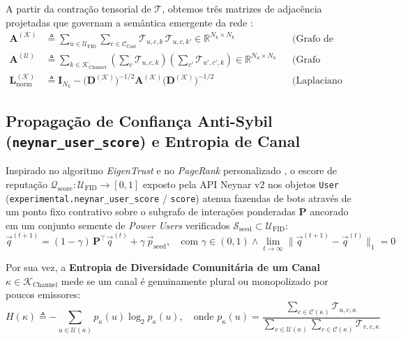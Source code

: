 \documentclass[11pt,a4paper]{article}
\begin{document}
A partir da contração tensorial de $\boldsymbol{\mathcal{T}}$, obtemos três matrizes de adjacência projetadas que governam a semântica emergente da rede \cite{cattuto2007network}:
\begin{align}
  \mathbf{A}^{(\mathcal{K})} &\triangleq \sum_{u \in \mathcal{U}_{\text{FID}}} \sum_{c \in \mathcal{C}_{\text{Cast}}} \mathcal{T}_{u,c,k} \, \mathcal{T}_{u,c,k'} \in \mathbb{R}^{N_k \times N_k} && \text{(Grafo de Afinidade Semântica entre Canais)} \\
  \mathbf{A}^{(\mathcal{U})} &\triangleq \sum_{k \in \mathcal{K}_{\text{Channel}}} \left(\sum_{c} \mathcal{T}_{u,c,k}\right) \left(\sum_{c'} \mathcal{T}_{u',c',k}\right) \in \mathbb{R}^{N_u \times N_u} && \text{(Grafo Homofílico de Comunidade por Canal)} \\
  \mathbf{L}_{\text{norm}}^{(\mathcal{K})} &\triangleq \mathbf{I}_{N_k} - \big(\mathbf{D}^{(\mathcal{K})}\big)^{-1/2} \mathbf{A}^{(\mathcal{K})} \big(\mathbf{D}^{(\mathcal{K})}\big)^{-1/2} && \text{(Laplaciano Normalizado da Folksonomia)}
\end{align}

\subsection{Propagação de Confiança Anti-Sybil (\texttt{neynar\_user\_score}) e Entropia de Canal}

Inspirado no algoritmo \emph{EigenTrust} \cite{kamvar2003eigentrust} e no \emph{PageRank} personalizado \cite{page1999pagerank}, o escore de reputação $\mathcal{Q}_{\text{score}} : \mathcal{U}_{\text{FID}} \to [0,1]$ exposto pela API Neynar v2 nos objetos \texttt{User} (\texttt{experimental.neynar\_user\_score} / \texttt{score}) atenua fazendas de bots através de um ponto fixo contrativo sobre o subgrafo de interações ponderadas $\mathbf{P}$ ancorado em um conjunto semente de \emph{Power Users} verificados $\mathcal{S}_{\text{seed}} \subset \mathcal{U}_{\text{FID}}$:
\begin{equation}
  \vec{q}^{(t+1)} = (1 - \gamma) \, \mathbf{P}^\top \vec{q}^{(t)} + \gamma \, \vec{p}_{\text{seed}}, \quad \text{com } \gamma \in (0, 1) \land \lim_{t \to \infty} \|\vec{q}^{(t+1)} - \vec{q}^{(t)}\|_1 = 0
\end{equation}

Por sua vez, a \textbf{Entropia de Diversidade Comunitária de um Canal} $\kappa \in \mathcal{K}_{\text{Channel}}$ mede se um canal é genuinamente plural ou monopolizado por poucos emissores:
\begin{equation}
  H(\kappa) \triangleq - \sum_{u \in \mathcal{U}(\kappa)} p_\kappa(u) \log_2 p_\kappa(u), \quad \text{onde } p_\kappa(u) = \frac{\sum_{c \in \mathcal{C}(\kappa)} \mathcal{T}_{u,c,\kappa}}{\sum_{v \in \mathcal{U}(\kappa)} \sum_{c \in \mathcal{C}(\kappa)} \mathcal{T}_{v,c,\kappa}}
\end{equation}
\end{document}
